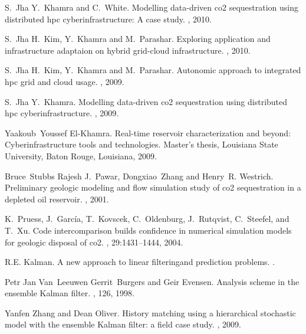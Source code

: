 \begin{thebibliography}{10}

S.~Jha Y.~Khamra and C.~White.
\newblock Modelling data-driven co2 sequestration using distributed hpc
  cyberinfrastructure: A case study.
, 2010.

S.~Jha H.~Kim, Y.~Khamra and M.~Parashar.
\newblock Exploring application and infrastructure adaptaion on hybrid
  grid-cloud infrastructure.
, 2010.

S.~Jha H.~Kim, Y.~Khamra and M.~Parashar.
\newblock Autonomic approach to integrated hpc grid and cloud usage.
, 2009.

S.~Jha Y.~Khamra.
\newblock Modelling data-driven co2 sequestration using distributed hpc
  cyberinfrastructure.
, 2009.

Yaakoub~Youssef El-Khamra.
\newblock Real-time reservoir characterization and beyond: Cyberinfrastructure
  tools and technologies.
\newblock Master's thesis, Louisiana State University, Baton Rouge, Louisiana,
  2009.

Bruce~Stubbs Rajesh J.~Pawar, Dongxiao~Zhang and Henry~R. Westrich.
\newblock Preliminary geologic modeling and flow simulation study of co2
  sequestration in a depleted oil reservoir.
, 2001.

K.~Pruess, J.~Garc{\'{i}}a, T.~Kovscek, C.~Oldenburg, J.~Rutqvist, C.~Steefel,
  and T.~Xu.
\newblock Code intercomparison builds confidence in numerical simulation models
  for geologic disposal of co2.
, 29:1431--1444, 2004.

R.E. Kalman.
\newblock A new approach to linear filteringand prediction problems.
.

Petr Jan Van~Leeuwen Gerrit~Burgers and Geir Evensen.
\newblock Analysis scheme in the ensemble {K}alman filter.
, 126,
  1998.

Yanfen Zhang and Dean Oliver.
\newblock History matching using a hierarchical stochastic model with the
  ensemble {K}alman filter: a field case study.
, 2009.


\end{thebibliography}
